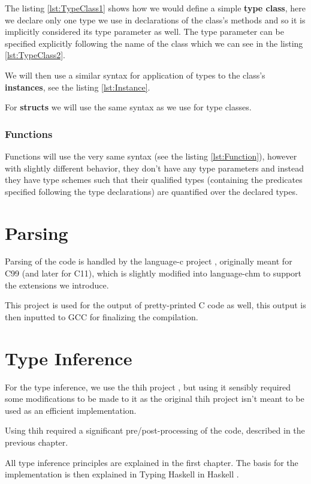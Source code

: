 The listing \ref{lst:TypeClass1} shows how we would define a simple \textbf{type class}, here we declare only one type we use in declarations of the class's methods and so it is implicitly considered its type parameter as well. The type parameter can be specified explicitly following the name of the class which we can see in the listing \ref{lst:TypeClass2}.

We will then use a similar syntax for application of types to the class's \textbf{instances}, see the listing \ref{lst:Instance}.

For \textbf{structs} we will use the same syntax as we use for type classes.

\subsubsection{Functions}

Functions will use the very same syntax (see the listing \ref{lst:Function}), however with slightly different behavior, they don't have any type parameters and instead they have type schemes such that their qualified types (containing the predicates specified following the type declarations) are quantified over the declared types.

\section{Parsing}

Parsing of the code is handled by the language-c project \cite{visq2018language-c}, originally meant for C99 (and later for C11), which is slightly modified into language-chm to support the extensions we introduce.

This project is used for the output of pretty-printed C code as well, this output is then inputted to GCC for finalizing the compilation.

\section{Type Inference}

For the type inference, we use the thih project \cite{jones1999typing}, but using it sensibly required some modifications to be made to it as the original thih project isn't meant to be used as an efficient implementation.

Using thih required a significant pre/post-processing of the code, described in the previous chapter. %

All type inference principles are explained in the first chapter. The basis for the implementation is then explained in Typing Haskell in Haskell \cite{jones1999typing}.

